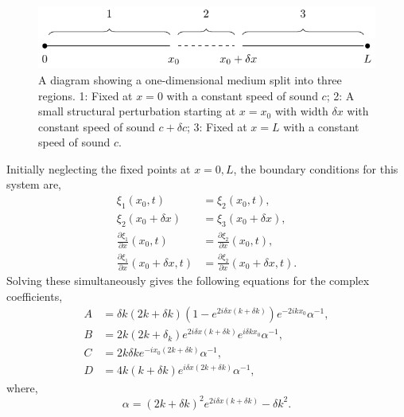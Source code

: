 \begin{figure}
    \centering
    \includegraphics{figures/glitch-1d-example-diagram.pdf}
    \caption[A diagram showing a one-dimensional medium with a small structural perturbation.]{A diagram showing a one-dimensional medium split into three regions. 1: Fixed at \(x=0\) with a constant speed of sound \(c\); 2: A small structural perturbation starting at \(x=x_0\) with width \(\delta x\) with constant speed of sound \(c + \delta c\); 3: Fixed at \(x=L\) with a constant speed of sound \(c\).}
    \label{fig:1d-diagram}
\end{figure}

Initially neglecting the fixed points at \(x = 0, L\), the boundary conditions for this system are,
%
\begin{align}
    \xi_1(x_0, t) &= \xi_2(x_0, t), \\
    \xi_2(x_0 + \delta x) &= \xi_3(x_0 + \delta x), \\
    \frac{\partial \xi_1}{\partial x}(x_0, t) &= \frac{\partial \xi_2}{\partial x}(x_0, t), \\
    \frac{\partial \xi_1}{\partial x}(x_0 + \delta x, t) &= \frac{\partial \xi_2}{\partial x}(x_0 + \delta x, t).
\end{align}
%
Solving these simultaneously gives the following equations for the complex coefficients,
%
\begin{align}
    A &= \delta k (2k + \delta k) (1 - e^{2i \delta x (k + \delta k)}) e^{- 2i k x_0} \alpha^{-1}, \\
    B &= 2 k (2k + \delta_k) e^{2i \delta x (k + \delta k)} e^{i \delta k x_0} \alpha^{-1}, \\
    C &= 2 k \delta k e^{- i x_0 (2k + \delta k)} \alpha^{-1}, \\
    D &= 4 k (k + \delta k) e^{i \delta x (2k + \delta k)} \alpha^{-1},
\end{align}
%
where,
\begin{equation}
    \alpha = (2k + \delta k)^2 e^{2 i \delta x (k + \delta k)} - \delta k^2.
\end{equation}
%

